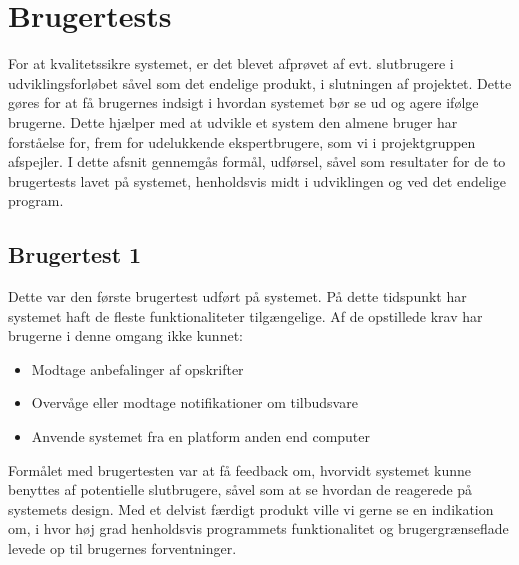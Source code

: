 \section{Brugertests}\label{s:brugertests}
For at kvalitetssikre systemet, er det blevet afprøvet af evt. slutbrugere i udviklingsforløbet såvel som det endelige produkt, i slutningen af projektet.
Dette gøres for at få brugernes indsigt i hvordan systemet bør se ud og agere ifølge brugerne.
Dette hjælper med at udvikle et system den almene bruger har forståelse for, frem for udelukkende ekspertbrugere, som vi i projektgruppen afspejler.
I dette afsnit gennemgås formål, udførsel, såvel som resultater for de to brugertests lavet på systemet, henholdsvis midt i udviklingen og ved det endelige program.


\subsection{Brugertest 1}
Dette var den første brugertest udført på systemet.
På dette tidspunkt har systemet haft de fleste funktionaliteter tilgængelige.
Af de opstillede krav har brugerne i denne omgang ikke kunnet:
\begin{itemize}
   \item{Modtage anbefalinger af opskrifter}
   \item{Overvåge eller modtage notifikationer om tilbudsvare}
   \item{Anvende systemet fra en platform anden end computer}
\end{itemize}
Formålet med brugertesten var at få feedback om, hvorvidt systemet kunne benyttes af potentielle slutbrugere, såvel som at se hvordan de reagerede på systemets design.
Med et delvist færdigt produkt ville vi gerne se en indikation om, i hvor høj grad henholdsvis programmets funktionalitet og brugergrænseflade levede op til brugernes forventninger.

